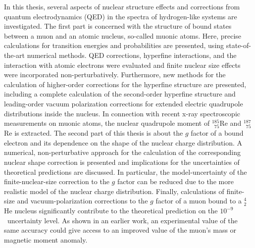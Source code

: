 
{\small
In this thesis, several aspects of nuclear structure effects and corrections from quantum electrodynamics (QED) in the spectra of hydrogen-like systems are investigated. 
The first part is concerned with the structure of bound states between a muon and an atomic nucleus, so-called muonic atoms. Here, precise calculations for transition energies and probabilities are presented, using state-of-the-art numerical methods. QED corrections, hyperfine interactions, and the interaction with atomic electrons were evaluated and finite nuclear size effects were incorporated non-perturbatively. 
Furthermore, new methods for the calculation of higher-order corrections for the hyperfine structure are presented, including a complete calculation of the second-order hyperfine structure and leading-order vacuum polarization corrections for extended electric quadrupole distributions inside the nucleus. 
In connection with recent x-ray spectroscopic measurements on muonic atoms, the nuclear quadrupole moment of $^{185}_{\phantom{1}75}$Re and $^{187}_{\phantom{1}75}$Re is extracted.
The second part of this thesis is about the $g$ factor of a bound electron and its dependence on the shape of the nuclear charge distribution. 
A numerical, non-perturbative approach for the calculation of the corresponding nuclear shape correction is presented and implications for the uncertainties of theoretical predictions are discussed. In particular, the model-uncertainty of the finite-nuclear-size correction to the $g$ factor can be reduced due to the more realistic model of the nuclear charge distribution.
Finally, calculations of finite-size and vacuum-polarization corrections to the $g$ factor of a muon bound to a $^{4}_2$He nucleus significantly contribute to the theoretical prediction on the $10^{-9}$~uncertainty level. As shown in an earlier work, an experimental value of the same accuracy could give access to an improved value of the muon's mass or magnetic moment anomaly.
}

\thispagestyle{empty}
